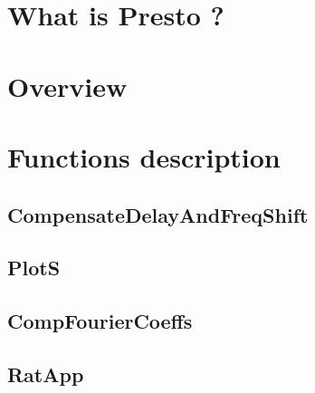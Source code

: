 \documentclass[12pt]{article}
\begin{document}
\section{What is Presto ?}

\section{Overview}

\section{Functions description}
\subsection{CompensateDelayAndFreqShift}

\subsection{PlotS}

\subsection{CompFourierCoeffs}

\subsection{RatApp}

\end{document}
